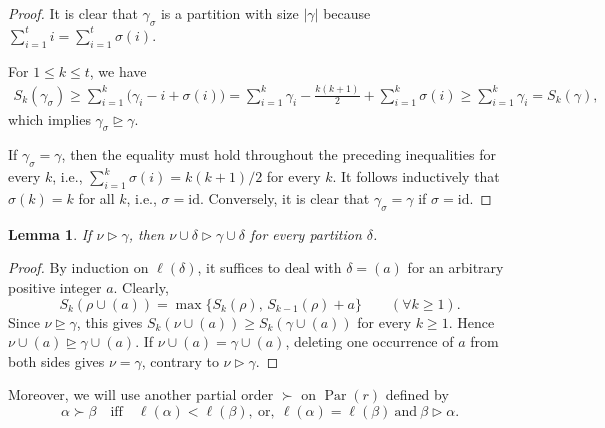 \documentclass[11pt]{amsart}
\numberwithin{equation}{section}
\theoremstyle{plain}
\newtheorem{lem}[thm]{Lemma}
\theoremstyle{definition}
\theoremstyle{remark}
\begin{document}
\begin{proof}
It is clear that $\gamma_\sigma$ is a partition with size $|\gamma|$ because $\sum_{i=1}^ti=\sum_{i=1}^t\sigma(i)$.

For $1\leq k\leq t$, we have 
$$
\begin{aligned}
S_k(\gamma_\sigma)\geq
\sum_{i=1}^k\bigl(\gamma_i-i+\sigma(i)\bigr)=
\sum_{i=1}^k\gamma_i
-\frac{k(k+1)}2+\sum_{i=1}^k\sigma(i)\geq
\sum_{i=1}^k\gamma_i=S_k(\gamma),
\end{aligned}
$$
which implies
$\gamma_\sigma\unrhd\gamma$.

If $\gamma_\sigma=\gamma$, then the equality must hold
throughout the preceding inequalities for every $k$, i.e.,
$\sum_{i=1}^k\sigma(i)=k(k+1)/2$ for every $k$. It follows inductively that $\sigma(k)=k$ for all $k$, i.e., $\sigma=\mathrm{id}$. Conversely, it is clear that $\gamma_{\sigma}=\gamma$ if $\sigma=\mathrm{id}$.
\end{proof}


\begin{lem}
\label{lem:union-dom}
If $\nu\triangleright\gamma$, then
$\nu\cup\delta\triangleright\gamma\cup\delta$ for every partition
$\delta$.
\end{lem}

\begin{proof}
By induction on $\ell(\delta)$, it suffices to deal with $\delta=(a)$ for an arbitrary positive
integer $a$.
Clearly,
$$
S_k(\rho\cup(a))
=\max\{S_k(\rho),\,S_{k-1}(\rho)+a\}
\qquad(\forall k\geq1).
$$
Since $\nu\unrhd\gamma$, this gives
$S_k(\nu\cup(a))\geq S_k(\gamma\cup(a))$ for every $k\geq1$.
Hence $\nu\cup(a)\unrhd\gamma\cup(a)$.
If $\nu\cup(a)=\gamma\cup(a)$, deleting one occurrence of $a$
from both sides gives $\nu=\gamma$, contrary to
$\nu\triangleright\gamma$.
\end{proof}

Moreover, we will use another partial order $\succ$ on $\operatorname{Par}(r)$ defined by
\begin{equation}\label{def:ps-order}
\alpha\succ\beta \quad\text{iff} \quad  \ell(\alpha)<\ell(\beta), \ \text{or},\ 
\ell(\alpha)=\ell(\beta)\ \text{and}\ 
\beta\triangleright\alpha.
\end{equation}


\end{document}
